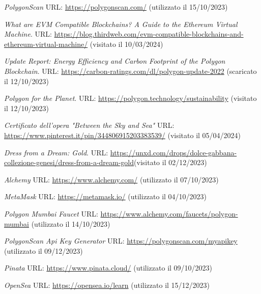 \documentclass[12pt]{report}
\begin{document}
\begin{thebibliography}{unsrt}
    \textit{PolygonScan}\newline
    URL: \url{https://polygonscan.com/} (utilizzato il 15/10/2023)

    \textit{What are EVM Compatible Blockchains? A Guide to the Ethereum Virtual Machine}. URL: \url{https://blog.thirdweb.com/evm-compatible-blockchains-and-ethereum-virtual-machine/} (visitato il 10/03/2024)

    \textit{Update Report: Energy Efficiency and Carbon Footprint of the Polygon Blockchain}. URL: \url{https://carbon-ratings.com/dl/polygon-update-2022} (scaricato il 12/10/2023)

    \textit{Polygon for the Planet}. URL: \url{https://polygon.technology/sustainability} (visitato il 12/10/2023)

    \textit{Certificato dell'opera "Between the Sky and Sea"}\newline
    URL: \url{https://www.pinterest.it/pin/344806915203383539/}\newline
    (visitato il 05/04/2024)

    \textit{Dress from a Dream: Gold}. URL: \url{https://unxd.com/drops/dolce-gabbana-collezione-genesi/dress-from-a-dream-gold}\newline(visitato il 02/12/2023)

    \textit{Alchemy}\newline
    URL: \url{https://www.alchemy.com/} (utilizzato il 07/10/2023)
    
    \textit{MetaMask}\newline
    URL: \url{https://metamask.io/} (utilizzato il 04/10/2023)
    
    \textit{Polygon Mumbai Faucet}\newline
    URL: \url{https://www.alchemy.com/faucets/polygon-mumbai}\newline
    (utilizzato il 14/10/2023)

    \textit{PolygonScan Api Key Generator}\newline
    URL: \url{https://polygonscan.com/myapikey} (utilizzato il 09/12/2023)

    \textit{Pinata}\newline
    URL: \url{https://www.pinata.cloud/} (utilizzato il 09/10/2023)

    \textit{OpenSea}\newline
    URL: \url{https://opensea.io/learn} (utilizzato il 15/12/2023)
\end{thebibliography}
\end{document}
